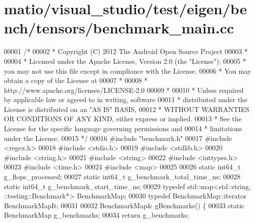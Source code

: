 \hypertarget{matio_2visual__studio_2test_2eigen_2bench_2tensors_2benchmark__main_8cc_source}{}\section{matio/visual\+\_\+studio/test/eigen/bench/tensors/benchmark\+\_\+main.cc}
\label{matio_2visual__studio_2test_2eigen_2bench_2tensors_2benchmark__main_8cc_source}

\begin{DoxyCode}
00001 \textcolor{comment}{/*}
00002 \textcolor{comment}{ * Copyright (C) 2012 The Android Open Source Project}
00003 \textcolor{comment}{ *}
00004 \textcolor{comment}{ * Licensed under the Apache License, Version 2.0 (the "License");}
00005 \textcolor{comment}{ * you may not use this file except in compliance with the License.}
00006 \textcolor{comment}{ * You may obtain a copy of the License at}
00007 \textcolor{comment}{ *}
00008 \textcolor{comment}{ *      http://www.apache.org/licenses/LICENSE-2.0}
00009 \textcolor{comment}{ *}
00010 \textcolor{comment}{ * Unless required by applicable law or agreed to in writing, software}
00011 \textcolor{comment}{ * distributed under the License is distributed on an "AS IS" BASIS,}
00012 \textcolor{comment}{ * WITHOUT WARRANTIES OR CONDITIONS OF ANY KIND, either express or implied.}
00013 \textcolor{comment}{ * See the License for the specific language governing permissions and}
00014 \textcolor{comment}{ * limitations under the License.}
00015 \textcolor{comment}{ */}
00016 \textcolor{preprocessor}{#include "benchmark.h"}
00017 \textcolor{preprocessor}{#include <regex.h>}
00018 \textcolor{preprocessor}{#include <stdio.h>}
00019 \textcolor{preprocessor}{#include <stdlib.h>}
00020 \textcolor{preprocessor}{#include <string.h>}
00021 \textcolor{preprocessor}{#include <string>}
00022 \textcolor{preprocessor}{#include <inttypes.h>}
00023 \textcolor{preprocessor}{#include <time.h>}
00024 \textcolor{preprocessor}{#include <map>}
00025 
00026 \textcolor{keyword}{static} int64\_t g\_flops\_processed;
00027 \textcolor{keyword}{static} int64\_t g\_benchmark\_total\_time\_ns;
00028 \textcolor{keyword}{static} int64\_t g\_benchmark\_start\_time\_ns;
00029 \textcolor{keyword}{typedef} std::map<std::string, ::testing::Benchmark*> BenchmarkMap;
00030 \textcolor{keyword}{typedef} BenchmarkMap::iterator BenchmarkMapIt;
00031 
00032 BenchmarkMap& gBenchmarks() \{
00033   \textcolor{keyword}{static} BenchmarkMap g\_benchmarks;
00034   \textcolor{keywordflow}{return} g\_benchmarks;

\end{DoxyCode}
